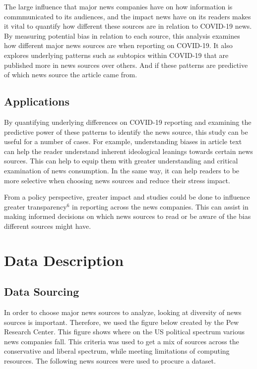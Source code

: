\documentclass[
]{article}
\begin{document}
The large influence that major news companies have on how information is
commmunicated to its audiences, and the impact news have on its readers
makes it vital to quantify how different these sources are in relation
to COVID-19 news. By measuring potential bias in relation to each
source, this analysis examines how different major news sources are when
reporting on COVID-19. It also explores underlying patterns such as
subtopics within COVID-19 that are published more in news sources over
others. And if these patterns are predictive of which news source the
article came from.

\hypertarget{applications}{%
\subsection{Applications}\label{applications}}

By quantifying underlying differences on COVID-19 reporting and
examining the predictive power of these patterns to identify the news
source, this study can be useful for a number of cases. For example,
understanding biases in article text can help the reader understand
inherent ideological leanings towards certain news sources. This can
help to equip them with greater understanding and critical examination
of news consumption. In the same way, it can help readers to be more
selective when choosing news sources and reduce their stress impact.

From a policy perspective, greater impact and studies could be done to
influence greater transparency\(^{6}\) in reporting across the news
companies. This can assist in making informed decisions on which news
sources to read or be aware of the bias different sources might have.

\hypertarget{data-description}{%
\section{Data Description}\label{data-description}}

\hypertarget{data-sourcing}{%
\subsection{Data Sourcing}\label{data-sourcing}}

In order to choose major news sources to analyze, looking at diversity
of news sources is important. Therefore, we used the figure below
created by the Pew Research Center. This figure shows where on the US
political spectrum various news companies fall. This criteria was used
to get a mix of sources across the conservative and liberal spectrum,
while meeting limitations of computing resources. The following news
sources were used to procure a dataset.
\end{document}
